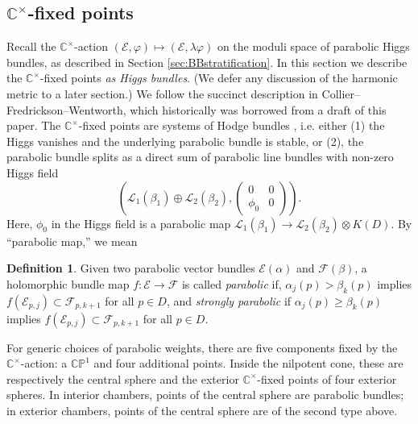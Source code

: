 \documentclass[12pt,letterpaper,reqno]{amsart}
\theoremstyle{remark}
\theoremstyle{definition}
\newtheorem{defn}[thm]{Definition}
\numberwithin{thm}{section}
\numberwithin{equation}{section}
\numberwithin{figure}{section}
\newcommand{\cL}{\ensuremath{\mathcal L}}
\newcommand{\cF}{\ensuremath{\mathcal F}}
\newcommand{\C}{\ensuremath{\mathbb C}}
\newcommand{\cE}{{\mathcal E}}
\begin{document}
\subsection{\texorpdfstring{$\C^\times$}{C*}-fixed points}\label{sec:fixedpoints}
Recall the $\C^\times$-action $(\cE, \varphi) \mapsto (\cE, \lambda \varphi)$ on the moduli space of parabolic Higgs bundles, as described in Section \ref{sec:BBstratification}. 
In this section we describe the $\C^\times$-fixed points \emph{as Higgs bundles}. (We defer any discussion of the harmonic metric to a later section.)
We follow the succinct description in  Collier--Fredrickson--Wentworth, which historically was borrowed from a draft of this paper.  The $\C^\times$-fixed points are systems of Hodge bundles \cite{SimpsonThesis}, i.e. either (1) the Higgs vanishes and the underlying parabolic bundle is stable, or (2), the parabolic bundle splits as a direct sum of parabolic line bundles with non-zero Higgs field 
\begin{equation}
        \label{eq general rk 2 fixed}\left(\cL_1(\beta_1)\oplus\cL_2(\beta_2),\begin{pmatrix}
        0&0\\\phi_0&0
\end{pmatrix}\right). 
\end{equation}
Here, 
$\phi_0$ in the Higgs field is a parabolic map $\cL_1(\beta_1)\to
\cL_2(\beta_2)\otimes K(D).$  By ``parabolic map,'' we mean
\begin{defn}
         \label{def parabolic morph}Given two parabolic vector bundles $\cE(\alpha)$ and $\cF(\beta)$, a holomorphic bundle map $f:\cE\to \cF$ is called {\em parabolic} if, $\alpha_j(p)> \beta_{k}(p)$ implies $f(\cE_{p,j})\subset \cF_{p,k+1}$ for all $p\in D$, and {\em strongly parabolic} if $\alpha_j(p)\geq \beta_k(p)$ implies $f(\cE_{p,j})\subset \cF_{p,k+1}$ for all $p\in D$.
 \end{defn} 
 
 \bigskip
 
 For generic choices of parabolic weights, there are five components fixed by the $\C^\times$-action: a $\mathbb{CP}^1$ and four additional points. Inside the nilpotent cone, these are respectively the central sphere and the exterior $\C^\times$-fixed points of  four exterior spheres.  In interior chambers, points of the central sphere are parabolic bundles; in exterior chambers, points of the central sphere are of the second type above.  
 
\end{document}
